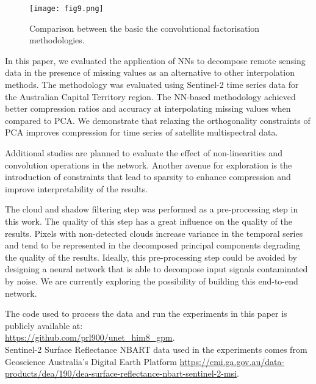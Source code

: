 \documentclass[essd, manuscript]{copernicus}
\begin{document}
\begin{figure}%
    \texttt{[image: fig9.png]}
    \caption{Comparison between the basic the convolutional factorisation methodologies.}%
    \label{compression_cmp}%
\end{figure}


\conclusions  %
In this paper, we evaluated the application of NNs to decompose remote sensing data in the presence of missing values as an alternative to other interpolation methods. The methodology was evaluated using Sentinel-2 time series data for the Australian Capital Territory region. The NN-based methodology achieved better compression ratios and accuracy at interpolating missing values when compared to PCA. We demonstrate that relaxing the orthogonality constraints of PCA improves compression for time series of satellite multispectral data.

Additional studies are planned to evaluate the effect of non-linearities and convolution operations in the network. Another avenue for exploration is the introduction of constraints that lead to sparsity to enhance compression and improve interpretability of the results. 

The cloud and shadow filtering step was performed as a pre-processing step in this work. The quality of this step has a great influence on the quality of the results. Pixels with non-detected clouds increase variance in the temporal series and tend to be represented in the decomposed principal components degrading the quality of the results. Ideally, this pre-processing step could be avoided by designing a neural network that is able to decompose input signals contaminated by noise. We are currently exploring the possibility of building this end-to-end network.






\codedataavailability{} 
The code used to process the data and run the experiments in this paper is publicly available at: \\
\href{https://github.com/prl900/unet_him8_gpm}{https://github.com/prl900/unet\_him8\_gpm}. \\
Sentinel-2 Surface Reflectance NBART data used in the experiments comes from Geoscience Australia's Digital Earth Platform \href{https://cmi.ga.gov.au/data-products/dea/190/dea-surface-reflectance-nbart-sentinel-2-msi}{https://cmi.ga.gov.au/data-products/dea/190/dea-surface-reflectance-nbart-sentinel-2-msi}. 
\end{document}
